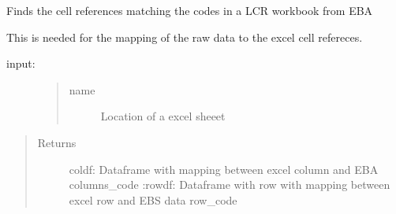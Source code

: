 \documentclass[letterpaper,10pt,english]{sphinxmanual}
\begin{document}
\begin{fulllineitems}
\label{\detokenize{onboard/model_Excel:model_Excel.findcoordinates}}
\pysigstartsignatures
{}
\pysigstopsignatures
\sphinxAtStartPar
Finds the cell references matching the codes in a LCR workbook from EBA

\sphinxAtStartPar
This is needed for the mapping of the raw data to the excel cell refereces.
\begin{description}
\item[{input:}] \leavevmode\begin{quote}\begin{description}
\item[{name}] \leavevmode
\sphinxAtStartPar
Location of a excel sheeet

\end{description}\end{quote}

\end{description}
\begin{quote}\begin{description}
\item[{Returns}] \leavevmode
\sphinxAtStartPar
coldf: Dataframe with mapping between excel column and EBA columns\_code
:rowdf: Dataframe with row with mapping between excel row and EBS data row\_code

\end{description}\end{quote}

\end{fulllineitems}

\end{document}
